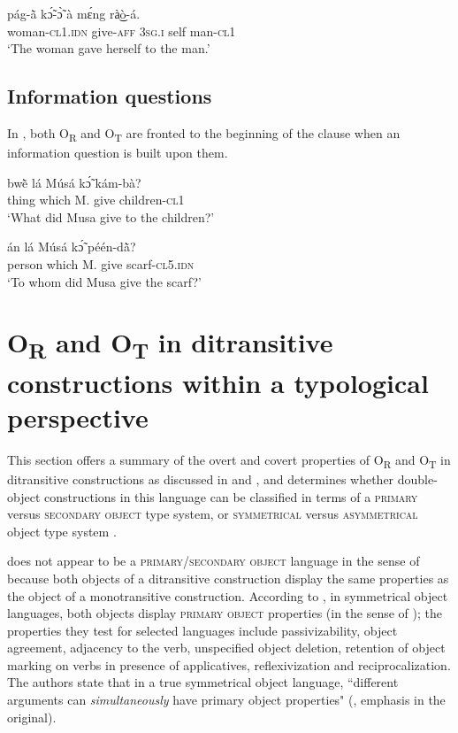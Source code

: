 \documentclass[output=paper]{langsci/langscibook}
\begin{document}
\ea
\label{ex:44.pacchiarotti}
\gll pág-\`{ã} kɔ̃́-ɔ̃̀ à mɛ́ng rà͜ò-á. \\
woman-\textsc{cl1.idn}  give-\textsc{aff}  \textsc{3sg.i}    self  man-\textsc{cl1}\\
\glt `The woman gave herself to the man.'
\z

\subsection{Information questions}\label{§5.5:Information.pacchiarotti}

In , both O\textsubscript{R} and O\textsubscript{T} are fronted to the beginning of the clause when an information question is built upon them. 

\ea
\label{ex:45.pacchiarotti}
\gll bw\`{ẽ}    lá    Músá  kɔ̃́  kám-bà?  \\
thing    which    M.  give  children-\textsc{cl1}\\
\glt `What did Musa give to the children?'
\z

\ea
\label{ex:46.pacchiarotti}
\gll án    lá    Músá  kɔ̃́  péén-d\`{ã}? \\
person  which    M.  give  scarf-\textsc{cl5.idn}\\
\glt `To whom did Musa give the scarf?'
\z

\section{O\textsubscript{R} and O\textsubscript{T} in  ditransitive constructions within a typological perspective}\label{§6:or.pacchiarotti}

This section offers a summary of the overt and covert properties of O\textsubscript{R} and O\textsubscript{T} in  ditransitive constructions as discussed in  and , and determines whether double-object constructions in this language can be classified in terms of a \textsc{primary} versus \textsc{secondary object} \citep{dryer1986} type system, or \textsc{symmetrical} versus \textsc{asymmetrical} object type system \citep{bresnanmoshi1990}.



 does not appear to be a \textsc{primary}/\textsc{secondary object} language in the sense of \citet{dryer1986} because both objects of a ditransitive construction display the same properties as the object of a monotransitive construction. According to \citet[147]{bresnanmoshi1990}, in symmetrical object languages, both objects display \textsc{primary object} properties (in the sense of \citealt{dryer1986}); the properties they test for selected  languages include passivizability, object agreement, adjacency to the verb, unspecified object deletion, retention of object marking on verbs in presence of applicatives, reflexivization and reciprocalization. The authors state that in a true symmetrical object language, ``different arguments can \textit{simultaneously} have primary object properties" (\citealt[153]{bresnanmoshi1990}, emphasis in the original).
\end{document}
